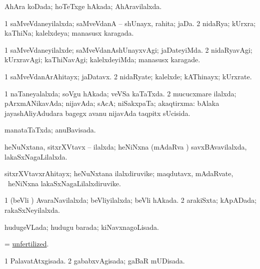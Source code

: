 \bentry
{} 
\gl{\gu}
\bmng
 AhAra koDada; hoTeTxge hAkada; AhAravilalxda. 
\emng
\eentry

\bentry
{} 
\gl{\gu}
\expl{}
\bmng
\bnum
\num{1} saMveVdaneyilalxda; saMveVdanA -- shUnayx, rahita; jaDa. 
\num{2} nidaRya; kUrxra; kaThiNa; kalelxdeya; manasusx karagada. 
\enum
\emng
\eentry

\bentry
{} 
\gl{\kirxvi}
\expl{}
\bmng
\bnum
\num{1} saMveVdaneyilalxde; saMveVdanAshUnayxvAgi; jaDateyiMda. 
\num{2} nidaRyavAgi; kUrxravAgi; kaThiNavAgi; kalelxdeyiMda; manasusx karagade. 
\enum
\emng
\eentry

\bentry
{} 
\gl{\nA}
\expl{}
\bmng
\bnum
\num{1} saMveVdanArAhitayx; jaDatavx. 
\num{2} nidaRyate; kalelxde; kAThinayx; kUrxrate. 
\enum
\emng
\eentry

\bentry
{} 
\gl{\gu}
\expl{}
\bmng
\bnum
\num{1} naTaneyalalxda; soVgu hAkada; veVSa kaTaTxda. 
\num{2} mucucxmare ilalxda; pArxmANikavAda; nijavAda; sAcA; niSakxpaTa; akaqtirxma:  bAlaka jayashAliyAdudara bagegx avanu nijavAda taqpitx sUcisida. 
\enum
\emng
\eentry

\bentry
{} 
\gl{\gu}
\expl{}
\bmng
 manataTaTxda; anuBavisada. 
\emng
\eentry

\bentry
{} 
\gl{\gu}
\expl{}
\bmng
 heNuNxtana, sitxrXVtavx -- ilalxda; heNiNxna (mAdaRva \mo) savxBAvavilalxda, lakaSxNagaLilalxda. 
\emng
\eentry

\bentry
{} 
\gl{\nA}
\expl{}
\bmng
 sitxrXVtavxrAhitayx; heNuNxtana ilalxdiruvike; maqdutavx, mAdaRvate, \mo\ heNiNxna lakaSxNagaLilalxdiruvike. 
\emng
\eentry

\bentry
{} 
\gl{\gu}
\expl{}
\bmng
\bnum
\num{1} (beVli \mo) AvaraNavilalxda; beVliyilalxda; beVli hAkada. 
\num{2} arakiSxta; kApADada; rakaSxNeyilalxda. 
\enum
\emng
\eentry

\bentry
{} 
\gl{\gu}
\expl{}
\bmng
 hudugeVLada; hudugu barada; kiNavxnagoLisada. 
\emng
\eentry

\bentry
{} 
\gl{\gu}
\expl{}
\bmng
 = \hyperlink{unfertilized}{unfertilized}. 
\emng
\eentry

\bentry
{} 
\gl{\gu}
\expl{}
\bmng
\bnum
\num{1} PalavatAtxgisada. 
\num{2} gababxvAgisada; gaBaR mUDisada. 
\enum
\emng
\eentry

